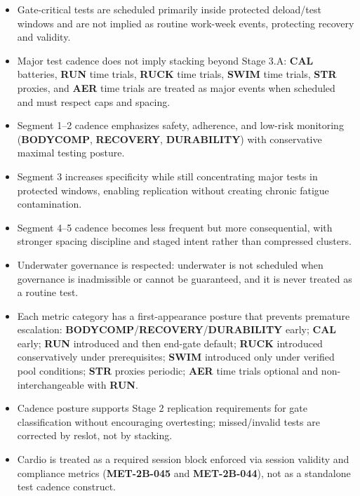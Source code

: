 \documentclass[10pt]{article}
\begin{document}
\begin{itemize}
\item Gate-critical tests are scheduled primarily inside protected deload/test windows and are not implied as routine work-week events, protecting recovery and validity.
\item Major test cadence does not imply stacking beyond Stage 3.A: \textbf{CAL} batteries, \textbf{RUN} time trials, \textbf{RUCK} time trials, \textbf{SWIM} time trials, \textbf{STR} proxies, and \textbf{AER} time trials are treated as major events when scheduled and must respect caps and spacing.
\item Segment 1–2 cadence emphasizes safety, adherence, and low-risk monitoring (\textbf{BODYCOMP}, \textbf{RECOVERY}, \textbf{DURABILITY}) with conservative maximal testing posture.
\item Segment 3 increases specificity while still concentrating major tests in protected windows, enabling replication without creating chronic fatigue contamination.
\item Segment 4–5 cadence becomes less frequent but more consequential, with stronger spacing discipline and staged intent rather than compressed clusters.
\item Underwater governance is respected: underwater is not scheduled when governance is inadmissible or cannot be guaranteed, and it is never treated as a routine test.
\item Each metric category has a first-appearance posture that prevents premature escalation: \textbf{BODYCOMP}/\textbf{RECOVERY}/\textbf{DURABILITY} early; \textbf{CAL} early; \textbf{RUN} introduced and then end-gate default; \textbf{RUCK} introduced conservatively under prerequisites; \textbf{SWIM} introduced only under verified pool conditions; \textbf{STR} proxies periodic; \textbf{AER} time trials optional and non-interchangeable with \textbf{RUN}.
\item Cadence posture supports Stage 2 replication requirements for gate classification without encouraging overtesting; missed/invalid tests are corrected by reslot, not by stacking.
\item Cardio is treated as a required session block enforced via session validity and compliance metrics (\textbf{MET-2B-045} and \textbf{MET-2B-044}), not as a standalone test cadence construct.
\end{itemize}
\end{document}
